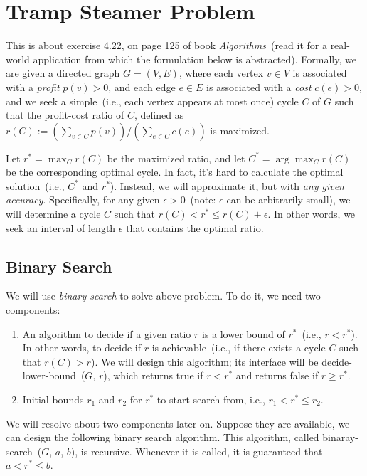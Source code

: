 \setcounter{definition}{0} \setcounter{property}{0} \setcounter{claim}{0} \setcounter{fact}{0} \setcounter{corollary}{0} \setcounter{figure}{0}
\section{Tramp Steamer Problem}

This is about exercise 4.22, on page 125 of book \emph{Algorithms}~(read it for a real-world application from which the formulation below is abstracted).
Formally, we are given a directed graph $G = (V, E)$,
where each vertex $v\in V$ is associated with a \emph{profit} $p(v) > 0$,
and each edge $e\in E$ is associated with a \emph{cost} $c(e) > 0$,
and we seek a simple~(i.e., each vertex appears at most once) cycle $C$ of $G$
such that the profit-cost ratio of $C$, defined as $r(C) := (\sum_{v\in C} p(v)) / (\sum_{e\in C} c(e))$
is maximized.

Let $r^* = \max_{C} r(C)$ be the maximized ratio, 
and let $C^* = \arg\max_{C} r(C)$ be the corresponding optimal cycle.
In fact, it's hard to calculate the optimal solution~(i.e., $C^*$ and $r^*$).
Instead, we will approximate it, but with \emph{any given accuracy}.
Specifically, for any given $\epsilon > 0$~(note: $\epsilon$ can be arbitrarily small),
we will determine a cycle $C$ such that $r(C) < r^* \le r(C) + \epsilon$.
In other words, we seek an interval of length $\epsilon$ that contains the optimal ratio.

\subsection*{Binary Search}

We will use \emph{binary search} to solve above problem. To do it, we need two components:
\begin{enumerate}
\item An algorithm to decide if a given ratio $r$ is a lower bound of $r^*$~(i.e., $r < r^*$). 
In other words, to decide if $r$ is achievable~(i.e., if there exists a cycle $C$ such that $r(C) > r$).
We will design this algorithm; its interface will be decide-lower-bound~($G$, $r$), which
returns true if $r < r^*$ and returns false if $r \ge r^*$.
\item Initial bounds $r_1$ and $r_2$ for $r^*$ to start search from, i.e., $r_1 < r^* \le r_2$.
\end{enumerate}

We will resolve about two components later on. Suppose they are available, we can design the following binary
search algorithm. This algorithm, called binaray-search~($G$, $a$, $b$), is recursive.
Whenever it is called, it is guaranteed that $a < r^* \le b$.

